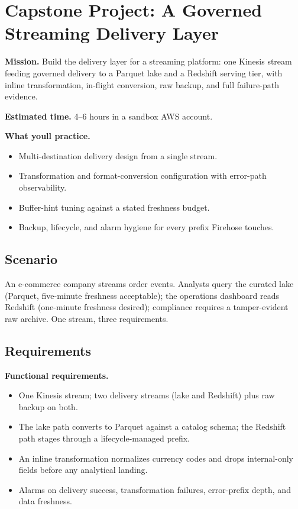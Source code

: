 \section{Capstone Project: A Governed Streaming Delivery Layer}\label{sec:ch14-capstone}

\begin{capstonebox}
\textbf{Mission.} Build the delivery layer for a streaming platform: one Kinesis stream feeding governed delivery to a Parquet lake and a Redshift serving tier, with inline transformation, in-flight conversion, raw backup, and full failure-path evidence.

\textbf{Estimated time.} 4--6 hours in a sandbox AWS account.

\textbf{What you\textquotesingle{}ll practice.}
\begin{itemize}
    \item Multi-destination delivery design from a single stream.
    \item Transformation and format-conversion configuration with error-path observability.
    \item Buffer-hint tuning against a stated freshness budget.
    \item Backup, lifecycle, and alarm hygiene for every prefix Firehose touches.
\end{itemize}
\end{capstonebox}

\subsection*{Scenario}
An e-commerce company streams order events. Analysts query the curated lake (Parquet, five-minute freshness acceptable); the operations dashboard reads Redshift (one-minute freshness desired); compliance requires a tamper-evident raw archive. One stream, three requirements.

\subsection*{Requirements}
\textbf{Functional requirements.}
\begin{itemize}
    \item One Kinesis stream; two delivery streams (lake and Redshift) plus raw backup on both.
    \item The lake path converts to Parquet against a catalog schema; the Redshift path stages through a lifecycle-managed prefix.
    \item An inline transformation normalizes currency codes and drops internal-only fields before any analytical landing.
    \item Alarms on delivery success, transformation failures, error-prefix depth, and data freshness.
\end{itemize}

